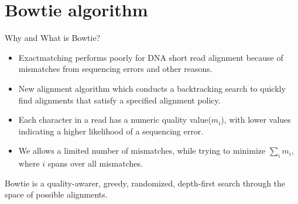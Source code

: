 \documentclass[mathserif]{beamer}
\begin{document}
\section{Bowtie algorithm}
\begin{frame}{Why and What is Bowtie?}
    \begin{itemize}
        \item Exactmatching performs poorly for DNA short read alignment because of mismatches from 
        sequencing errors and other reasons.
        \item New alignment algorithm which conducts a backtracking search to
        quickly find alignments that satisfy a specified alignment policy. 
        \item Each character in a read has a numeric quality value($m_i$), with
        lower values indicating a higher likelihood of a sequencing
        error. 
        \item We allows a limited number of mismatches, while trying to minimize $\sum_i m_i$, 
        where $i$ spans over all mismatches. 
    \end{itemize} 
    Bowtie is a quality-awarer, greedy, randomized, depth-first search through the
    space of possible alignments.
\end{frame}
\end{document}
